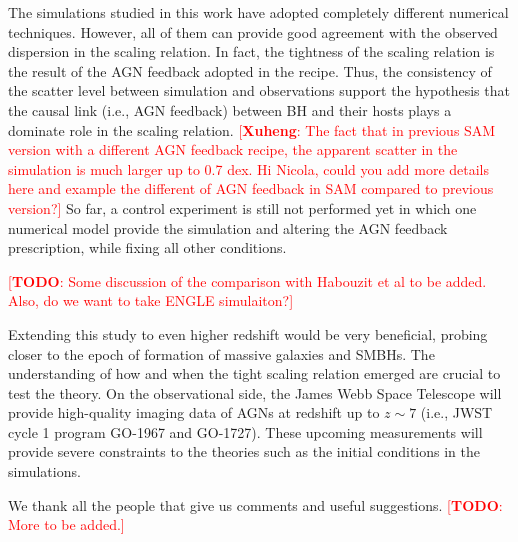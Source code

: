 \documentclass[twocolumn]{aastex631}
\newcommand{\todo}[1]{\textcolor{red}{[{\bf TODO}: #1]}}
\newcommand{\ding}[1]{\textcolor{red}{[{\bf Xuheng}: #1]}}
\begin{document}
The simulations studied in this work have adopted completely different numerical techniques. However, all of them can provide good agreement with the observed dispersion in the scaling relation. In fact, the tightness of the scaling relation is the result of the AGN feedback adopted in the recipe. Thus, the consistency of the scatter level between simulation and observations support the hypothesis that the causal link (i.e., AGN feedback) between BH and their hosts plays a dominate role in the scaling relation. 
\ding{The fact that in previous SAM version with a different AGN feedback recipe, the apparent scatter in the simulation is much larger up to 0.7 dex. Hi Nicola, could you add more details here and example the different of AGN feedback in SAM compared to previous version?}
So far, a control experiment is still not performed yet in which one numerical model provide the simulation and altering the AGN feedback prescription, while fixing all other conditions.

\todo{Some discussion of the comparison with Habouzit et al to be added. Also, do we want to take ENGLE simulaiton?}

Extending this study to even higher redshift would be very beneficial, probing closer to the epoch of formation of massive galaxies and SMBHs. The understanding of how and when the tight scaling relation emerged are crucial to test the theory. On the observational side, the James Webb Space Telescope will provide high-quality imaging data of AGNs at redshift up to $z\sim7$ (i.e., JWST cycle 1 program GO-1967 and GO-1727). These upcoming measurements will provide severe constraints to the theories such as the initial conditions in the simulations.


\begin{acknowledgments}
We thank all the people that give us comments and useful suggestions. \todo{More to be added.}

\end{acknowledgments}


\vspace{5mm}

\end{document}
